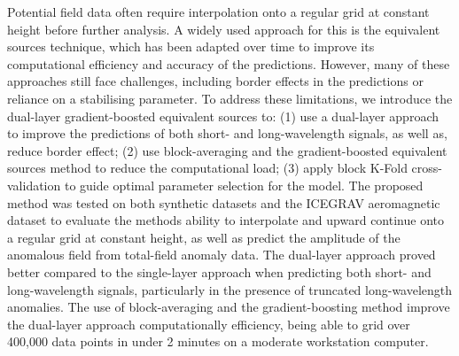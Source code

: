Potential field data often require interpolation onto a regular grid at constant height before further analysis. A widely used approach for this is the equivalent sources technique, which has been adapted over time to improve its computational efficiency and accuracy of the predictions. However, many of these approaches still face challenges, including border effects in the predictions or reliance on a stabilising parameter. To address these limitations, we introduce the dual-layer gradient-boosted equivalent sources to: (1) use a dual-layer approach to improve the predictions of both short- and long-wavelength signals, as well as, reduce border effect; (2) use block-averaging and the gradient-boosted equivalent sources method to reduce the computational load; (3) apply block K-Fold cross-validation to guide optimal parameter selection for the model. The proposed method was tested on both synthetic datasets and the ICEGRAV aeromagnetic dataset to evaluate the methods ability to interpolate and upward continue onto a regular grid at constant height, as well as predict the amplitude of the anomalous field from total-field anomaly data. The dual-layer approach proved better compared to the single-layer approach when predicting both short- and long-wavelength signals, particularly in the presence of truncated long-wavelength anomalies. The use of block-averaging and the gradient-boosting method improve the dual-layer approach computationally efficiency, being able to grid over 400,000 data points in under 2 minutes on a moderate workstation computer.